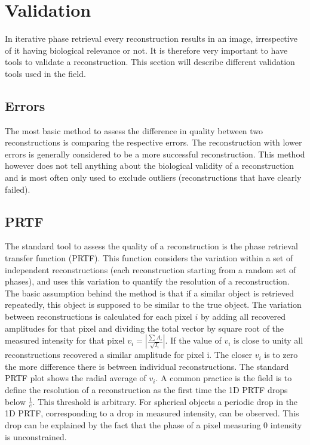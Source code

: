 \section{Validation}
In iterative phase retrieval every reconstruction results in an image, irrespective of it having biological relevance or not. It is therefore very important to have tools to validate a reconstruction. This section will describe different validation tools used in the field.

\subsection{Errors}
The most basic method to assess the difference in quality between two reconstructions is comparing the respective errors. The reconstruction with lower errors is generally considered to be a more successful reconstruction. This method however does not tell anything about the biological validity of a reconstruction and is most often only used to exclude outliers (reconstructions that have clearly failed).
 
\subsection{PRTF}
The standard tool to assess the quality of a reconstruction is the phase retrieval transfer function (PRTF). This function considers the variation within a set of independent reconstructions (each reconstruction starting from a random set of phases), and uses this variation to quantify the resolution of a reconstruction. The basic assumption behind the method is that if a similar object is retrieved repeatedly, this object is supposed to be similar to the true object. The variation between reconstructions is calculated for each pixel $i$ by adding all recovered amplitudes for that pixel and dividing the total vector by square root of the measured intensity for that pixel $v_i = |\frac{\sum A_i}{\sqrt{I_i}}|$. If the value of $v_i$ is close to unity all reconstructions recovered a similar amplitude for pixel i. The closer $v_i$ is to zero the more difference there is between individual reconstructions. The standard PRTF plot shows the radial average of $v_i$. A common practice is the field is to define the resolution of a reconstruction as the first time the 1D PRTF drops below $\frac{1}{e}$. This threshold is arbitrary. For spherical objects a periodic drop in the 1D PRTF, corresponding to a drop in measured intensity, can be observed. This drop can be explained by the fact that the phase of a pixel measuring 0 intensity is unconstrained.
 
